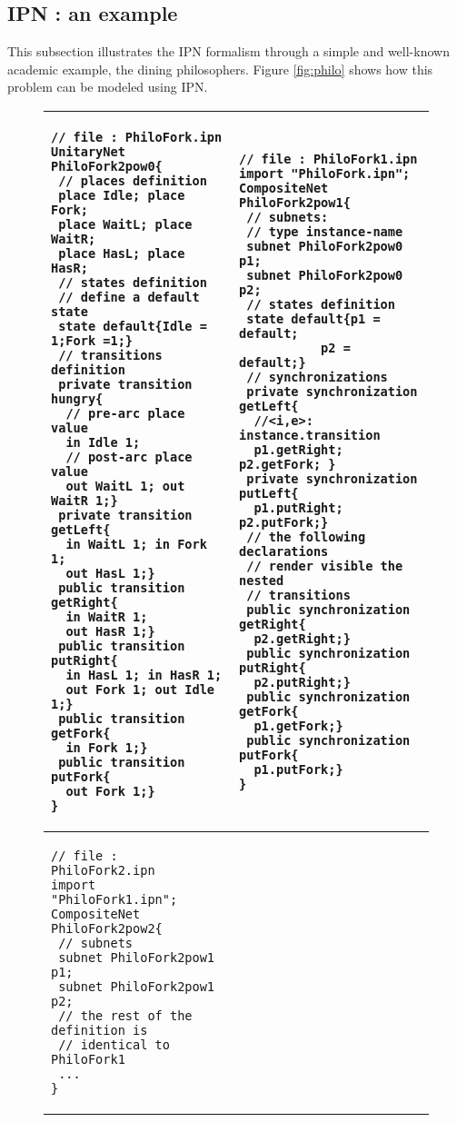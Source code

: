 \subsection{IPN : an example}
\label{ss:philo}
This subsection illustrates the IPN formalism through a simple and
well-known academic example, the dining philosophers.  Figure
\ref{fig:philo} shows how this problem can be modeled using IPN.
\lstset{language=IPN}
\begin{figure}
\begin{tabular}{l|l}
\begin{lstlisting}
// file : PhiloFork.ipn
UnitaryNet PhiloFork2pow0{
 // places definition
 place Idle; place Fork;
 place WaitL; place WaitR;
 place HasL; place HasR;
 // states definition
 // define a default state
 state default{Idle = 1;Fork =1;}
 // transitions definition
 private transition hungry{
  // pre-arc place value
  in Idle 1;
  // post-arc place value
  out WaitL 1; out WaitR 1;}
 private transition getLeft{
  in WaitL 1; in Fork 1;
  out HasL 1;}
 public transition getRight{
  in WaitR 1;
  out HasR 1;}
 public transition putRight{
  in HasL 1; in HasR 1;
  out Fork 1; out Idle 1;}
 public transition getFork{
  in Fork 1;}
 public transition putFork{
  out Fork 1;}
}
\end{lstlisting}
&
\begin{lstlisting}
// file : PhiloFork1.ipn
import "PhiloFork.ipn";
CompositeNet PhiloFork2pow1{
 // subnets: 
 // type instance-name
 subnet PhiloFork2pow0 p1;
 subnet PhiloFork2pow0 p2;
 // states definition
 state default{p1 = default;
           p2 = default;}
 // synchronizations
 private synchronization getLeft{
  //<i,e>: instance.transition	
  p1.getRight; p2.getFork; }
 private synchronization putLeft{
  p1.putRight; p2.putFork;}
 // the following declarations
 // render visible the nested
 // transitions
 public synchronization getRight{
  p2.getRight;}
 public synchronization putRight{
  p2.putRight;}
 public synchronization getFork{
  p1.getFork;}
 public synchronization putFork{
  p1.putFork;}
}
\end{lstlisting}
\\
\hline
\begin{lstlisting}
// file : PhiloFork2.ipn
import "PhiloFork1.ipn";
CompositeNet PhiloFork2pow2{
 // subnets
 subnet PhiloFork2pow1 p1;
 subnet PhiloFork2pow1 p2;
 // the rest of the definition is
 // identical to PhiloFork1
 ...
}
\end{lstlisting}

\end{tabular}
\end{figure}
